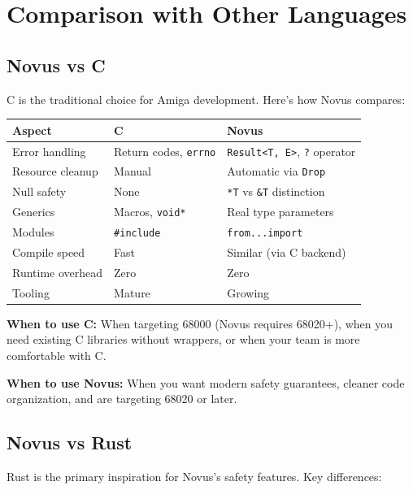 \section{Comparison with Other Languages}
\label{sec:comparisons}

\subsection{Novus vs C}

C is the traditional choice for Amiga development. Here's how Novus compares:

\begin{center}
\begin{tabular}{lll}
\textbf{Aspect} & \textbf{C} & \textbf{Novus} \\
\hline
Error handling & Return codes, \texttt{errno} & \texttt{Result<T, E>}, \texttt{?} operator \\
Resource cleanup & Manual & Automatic via \texttt{Drop} \\
Null safety & None & \texttt{*T} vs \texttt{\&T} distinction \\
Generics & Macros, \texttt{void*} & Real type parameters \\
Modules & \texttt{\#include} & \texttt{from...import} \\
Compile speed & Fast & Similar (via C backend) \\
Runtime overhead & Zero & Zero \\
Tooling & Mature & Growing \\
\end{tabular}
\end{center}

\textbf{When to use C:} When targeting 68000 (Novus requires 68020+), when you need existing C libraries without wrappers, or when your team is more comfortable with C.

\textbf{When to use Novus:} When you want modern safety guarantees, cleaner code organization, and are targeting 68020 or later.

\subsection{Novus vs Rust}

Rust is the primary inspiration for Novus's safety features. Key differences:

